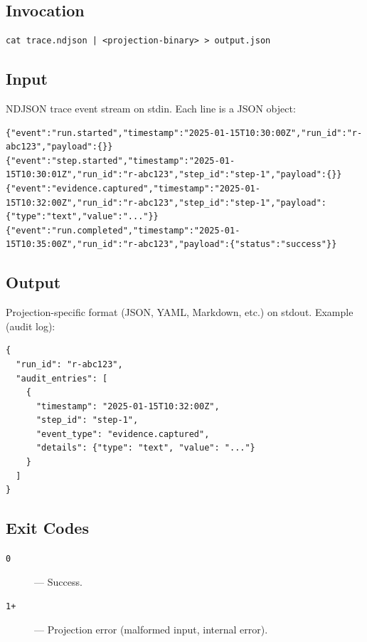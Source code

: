 \subsection{Invocation}

\begin{verbatim}
cat trace.ndjson | <projection-binary> > output.json
\end{verbatim}

\subsection{Input}

NDJSON trace event stream on stdin. Each line is a JSON object:

\begin{verbatim}
{"event":"run.started","timestamp":"2025-01-15T10:30:00Z","run_id":"r-abc123","payload":{}}
{"event":"step.started","timestamp":"2025-01-15T10:30:01Z","run_id":"r-abc123","step_id":"step-1","payload":{}}
{"event":"evidence.captured","timestamp":"2025-01-15T10:32:00Z","run_id":"r-abc123","step_id":"step-1","payload":{"type":"text","value":"..."}}
{"event":"run.completed","timestamp":"2025-01-15T10:35:00Z","run_id":"r-abc123","payload":{"status":"success"}}
\end{verbatim}

\subsection{Output}

Projection-specific format (JSON, YAML, Markdown, etc.) on stdout. Example
(audit log):

\begin{verbatim}
{
  "run_id": "r-abc123",
  "audit_entries": [
    {
      "timestamp": "2025-01-15T10:32:00Z",
      "step_id": "step-1",
      "event_type": "evidence.captured",
      "details": {"type": "text", "value": "..."}
    }
  ]
}
\end{verbatim}

\subsection{Exit Codes}

\begin{description}
  \item[\texttt{0}] --- Success.
  \item[\texttt{1+}] --- Projection error (malformed input, internal error).
\end{description}

